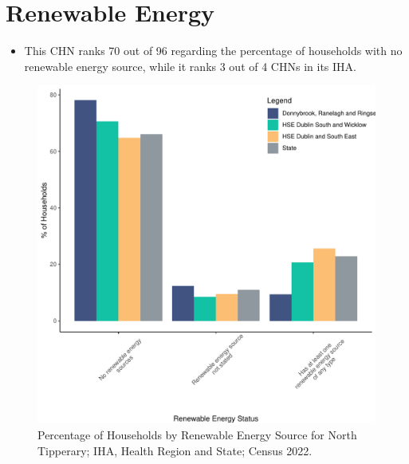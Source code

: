 \documentclass{article}
\begin{document}
\section{Renewable Energy}\label{sect:RE}
\begin{itemize}
\item This CHN ranks  70 out of 96 regarding the percentage of households with no renewable energy source, while it ranks   3 out of 4 CHNs in its IHA.
\end{itemize}
\begin{figure}[H]
	\centering
	\includegraphics[width = 140mm]{../figures/RenewableEnergyED.pdf}
	\caption{Percentage of Households by Renewable Energy Source for North Tipperary; IHA, Health Region and State; Census 2022.}
	\label{fig:vbnv}
	\end{figure}
\end{document}
